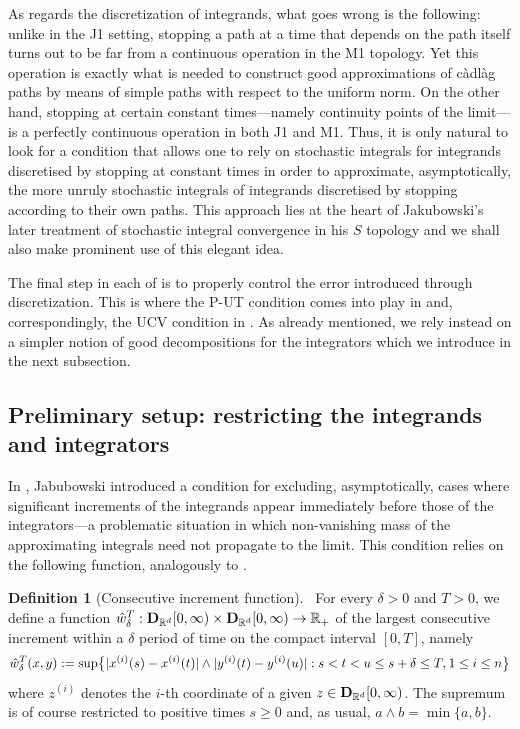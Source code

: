 \documentclass[11pt]{article}
\theoremstyle{definition}\newtheorem{example}[theorem]{Example}
\theoremstyle{definition}\newtheorem{counterexample}[theorem]{Counterexample}
\theoremstyle{definition}\newtheorem{remark}[theorem]{Remark}
\theoremstyle{definition}\newtheorem{defi}[theorem]{Definition}
\numberwithin{equation}{section}
\newcommand{\R}{\mathbb{R}}
\newcommand{\D}{{\bf D}}											%
\renewcommand{\|}{\; : \, \;}											%
\begin{document}
As regards the discretization of integrands, what goes wrong is the following: unlike in the J1 setting, stopping a path at a time that depends on the path itself turns out to be far from a continuous operation in the M1 topology. Yet this operation is exactly what is needed to construct good approximations of càdlàg paths by means of simple paths with respect to the uniform norm. On the other hand, stopping at certain constant times---namely continuity points of the limit---is a perfectly continuous operation in both J1 and M1. Thus, it is only natural to look for a condition that allows one to rely on stochastic integrals for integrands discretised by stopping at constant times in order to approximate, asymptotically, the more unruly stochastic integrals of integrands discretised by stopping according to their own paths. This approach lies at the heart of Jakubowski's later treatment of stochastic integral convergence in his $S$ topology \cite{jakubowski} and we shall also make prominent use of this elegant idea.

The final step in each of \cite{jakubowski, jakubowskimeminpages, kurtzprotter} is to properly control the error introduced through discretization. This is where the P-UT condition comes into play in \cite{jakubowski, jakubowskimeminpages} and, correspondingly, the UCV condition in \cite{kurtzprotter}.  As already mentioned, we rely instead on a simpler notion of good decompositions for the integrators which we introduce in the next subsection.





\subsection{Preliminary setup: restricting the integrands and integrators}\label{subsect:prelim_setup}

In \cite{jakubowski}, Jabubowski introduced a condition for excluding, asymptotically, cases where significant increments of the integrands appear immediately before those of the integrators---a problematic situation in which non-vanishing mass of the approximating integrals need not propagate to the limit. This condition relies on the following function, analogously to \cite[p.~2144]{jakubowski}.

\begin{defi}[Consecutive increment function] \ \label{defi:3.19} 
	For every $\delta>0$ and $T>0$, we define a function $\hat{w}^T_\delta: \D_{\R^d}[0,\infty) \times \D_{\R^d}[0,\infty) \to \R_+$ of the largest consecutive increment within a $\delta$ period of time on the compact interval $[0,T]$, namely
	\[
	\hat{w}^T_{\delta}(x,y)  := \operatorname{sup}\bigl\{  |x^{(i)}(s)- x^{(i)}(t)| \wedge |y^{(i)}(t)-y^{(i)}(u)|  :   s < t  < u \le s+\delta \leq T, \hspace{0.5pt} 1\leq i \leq n    \bigr\}
	\]
	 where $z^{(i)}$ denotes the $i$-th coordinate of a given $z\in \D_{\R^d}[0,\infty)$. The supremum is of course restricted to positive times $ s\geq 0$ and, as usual, $a\wedge b= \operatorname{min}\{a,b\}$.
\end{defi}
\end{document}
